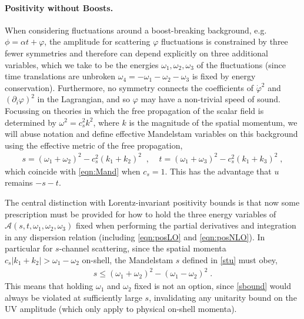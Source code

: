 \documentclass[11pt]{article}
\begin{document}
\paragraph{Positivity without Boosts.}
When considering fluctuations around a boost-breaking background, e.g. $\phi = \alpha t + \varphi$, the amplitude for scattering $\varphi$ fluctuations is constrained by three fewer symmetries and therefore can depend explicitly on three additional variables, which we take to be the energies $\omega_1, \omega_2 ,  \omega_3$ of the fluctuations (since time translations are unbroken $\omega_4 = - \omega_1 - \omega_2 - \omega_3$ is fixed by energy conservation). Furthermore, no symmetry connects the coefficients of $\dot \varphi^2$ and $(\partial_i \varphi)^2$ in the Lagrangian, and so $\varphi$ may have a non-trivial speed of sound. Focussing on theories in which the free propagation of the scalar field is determined by $\omega^2 = c_s^2 k^2$, where $k$ is the magnitude of the spatial momentum, we will abuse notation and define effective Mandelstam variables on this background using the effective metric of the free propagation,
\begin{align}
 s = (\omega_1 + \omega_2 )^2 - c_s^2 ( k_1 + k_2 )^2 \;\; , \;\;\;\; t = (\omega_1 + \omega_3 )^2 - c_s^2 ( k_1 + k_3 )^2 \; , 
 \label{stu}
\end{align}
which coincide with \eqref{eqn:Mand} when $c_s = 1$. This has the advantage that $u$ remains $-s-t$. 

The central distinction with Lorentz-invariant positivity bounds is that now some prescription must be provided for how to hold the three energy variables of $\mathcal{A} (s,t, \omega_1 ,\omega_2, \omega_3 )$ fixed when performing the partial derivatives and integration in any dispersion relation (including \eqref{eqn:posLO} and \eqref{eqn:posNLO}). 
In particular for $s$-channel scattering, since the spatial momenta $c_s | k_1 + k_2 | > \omega_1 - \omega_2$ on-shell, the Mandelstam $s$ defined in \eqref{stu} must obey,
\begin{align}
 s \leq ( \omega_1 + \omega_2 )^2 - (\omega_1 - \omega_2 )^2 \; .
 \label{sbound}
\end{align}
This means that holding $\omega_1$ and $\omega_2$ fixed is not an option, since \eqref{sbound} would always be violated at sufficiently large $s$, invalidating any unitarity bound on the UV amplitude (which only apply to physical on-shell momenta).
\end{document}
